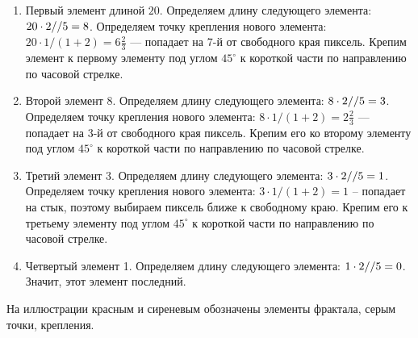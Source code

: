 \explanationSection
\begin{enumerate}
    \item Первый элемент длиной $20$. Определяем длину следующего элемента: $20 \cdot 2\space // \space 5 = 8$. Определяем точку 
    крепления нового элемента: $20 \cdot 1 / (1 + 2) = 6 \frac{2}{3}$  — попадает на 7-й от свободного края пиксель. Крепим элемент 
    к первому элементу под углом $45^{\circ}$ к короткой части по направлению по часовой стрелке. 
    \item Второй элемент $8$. Определяем длину следующего элемента: $8 \cdot 2 \space // \space 5 = 3$. Определяем точку крепления 
    нового элемента: $8 \cdot 1 / (1 + 2) = 2 \frac{2}{3}$  — попадает на 3-й от свободного края пиксель. Крепим его ко второму 
    элементу под углом $45^{\circ}$ к короткой части по направлению по часовой стрелке. 
    \item Третий элемент 3. Определяем длину следующего элемента: $3 \cdot 2 \space // \space 5 = 1$. Определяем точку крепления 
    нового элемента: $3 \cdot 1 / (1 + 2) = 1$  -- попадает на стык, поэтому выбираем пиксель ближе к свободному краю. 
    Крепим его к третьему элементу под углом $45^{\circ}$ к короткой части по направлению по часовой стрелке.
    \item Четвертый элемент 1. Определяем длину следующего элемента: $1 \cdot 2 \space // \space 5 = 0$. Значит, этот элемент последний.
\end{enumerate}

На иллюстрации красным и сиреневым обозначены элементы фрактала, серым точки, крепления.


